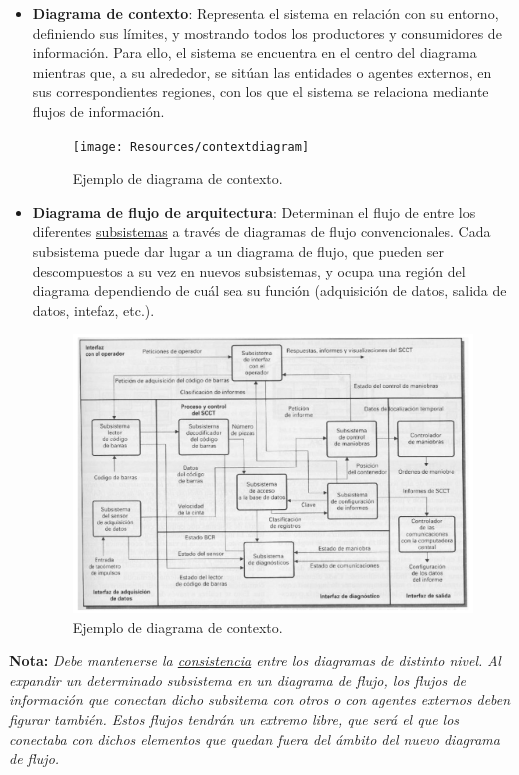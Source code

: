 \begin{itemize}
    \item \textbf{Diagrama de contexto}: Representa el sistema en relación con su entorno, definiendo sus límites, y mostrando todos los productores y consumidores de información. Para ello, el sistema se encuentra en el centro del diagrama mientras que, a su alrededor, se sitúan las entidades o agentes externos, en sus correspondientes regiones, con los que el sistema se relaciona mediante flujos de información.
        \begin{figure}[H]
            \centering
            \texttt{[image: Resources/contextdiagram]}
            \caption{Ejemplo de diagrama de contexto.}
            \label{fig:diagramaDeContexto}
        \end{figure}
    \item \textbf{Diagrama de flujo de arquitectura}: Determinan el flujo de entre los diferentes \uline{subsistemas} a través de diagramas de flujo convencionales. Cada subsistema puede dar lugar a un diagrama de flujo, que pueden ser descompuestos a su vez en nuevos subsistemas, y ocupa una región del diagrama dependiendo de cuál sea su función (adquisición de datos, salida de datos, intefaz, etc.).
        \begin{figure}[H]
            \centering
            \includegraphics[width=0.8\linewidth]{Resources/Tema4/diagramaFlujo.png}
            \caption{Ejemplo de diagrama de contexto.}
            \label{fig:diagramaDeContexto}
        \end{figure}
\end{itemize}

\textbf{Nota:} \textit{Debe mantenerse la \uline{consistencia} entre los diagramas de distinto nivel. Al expandir un determinado subsistema en un diagrama de flujo, los flujos de información que conectan dicho subsitema con otros o con agentes externos deben figurar también. Estos flujos tendrán un extremo libre, que será el que los conectaba con dichos elementos que quedan fuera del ámbito del nuevo diagrama de flujo.}\\

